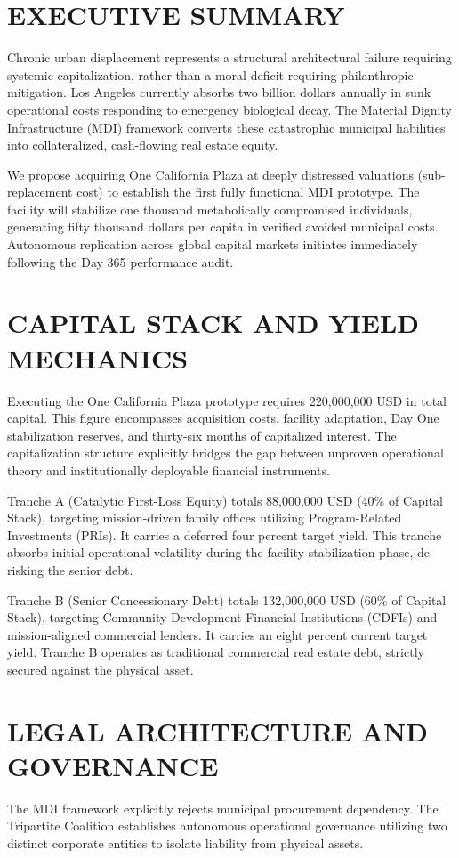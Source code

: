 \documentclass[12pt, letterpaper]{article}
\begin{document}
\section{EXECUTIVE SUMMARY}
Chronic urban displacement represents a structural architectural failure requiring systemic capitalization, rather than a moral deficit requiring philanthropic mitigation. Los Angeles currently absorbs two billion dollars annually in sunk operational costs responding to emergency biological decay. The Material Dignity Infrastructure (MDI) framework converts these catastrophic municipal liabilities into collateralized, cash-flowing real estate equity. 

We propose acquiring One California Plaza at deeply distressed valuations (sub-replacement cost) to establish the first fully functional MDI prototype. The facility will stabilize one thousand metabolically compromised individuals, generating fifty thousand dollars per capita in verified avoided municipal costs. Autonomous replication across global capital markets initiates immediately following the Day 365 performance audit. 

\clearpage
\section{CAPITAL STACK AND YIELD MECHANICS}
Executing the One California Plaza prototype requires 220,000,000 USD in total capital. This figure encompasses acquisition costs, facility adaptation, Day One stabilization reserves, and thirty-six months of capitalized interest. The capitalization structure explicitly bridges the gap between unproven operational theory and institutionally deployable financial instruments.

Tranche A (Catalytic First-Loss Equity) totals 88,000,000 USD (40\% of Capital Stack), targeting mission-driven family offices utilizing Program-Related Investments (PRIs). It carries a deferred four percent target yield. This tranche absorbs initial operational volatility during the facility stabilization phase, de-risking the senior debt.

Tranche B (Senior Concessionary Debt) totals 132,000,000 USD (60\% of Capital Stack), targeting Community Development Financial Institutions (CDFIs) and mission-aligned commercial lenders. It carries an eight percent current target yield. Tranche B operates as traditional commercial real estate debt, strictly secured against the physical asset.

\section{LEGAL ARCHITECTURE AND GOVERNANCE}
The MDI framework explicitly rejects municipal procurement dependency. The Tripartite Coalition establishes autonomous operational governance utilizing two distinct corporate entities to isolate liability from physical assets.
\end{document}
